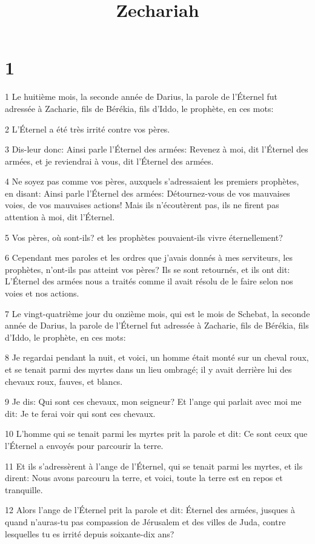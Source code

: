

\title{Zechariah}


\chapter{1}

\par 1 Le huitième mois, la seconde année de Darius, la parole de l'Éternel fut adressée à Zacharie, fils de Bérékia, fils d'Iddo, le prophète, en ces mots:
\par 2 L'Éternel a été très irrité contre vos pères.
\par 3 Dis-leur donc: Ainsi parle l'Éternel des armées: Revenez à moi, dit l'Éternel des armées, et je reviendrai à vous, dit l'Éternel des armées.
\par 4 Ne soyez pas comme vos pères, auxquels s'adressaient les premiers prophètes, en disant: Ainsi parle l'Éternel des armées: Détournez-vous de vos mauvaises voies, de vos mauvaises actions! Mais ils n'écoutèrent pas, ils ne firent pas attention à moi, dit l'Éternel.
\par 5 Vos pères, où sont-ils? et les prophètes pouvaient-ils vivre éternellement?
\par 6 Cependant mes paroles et les ordres que j'avais donnés à mes serviteurs, les prophètes, n'ont-ils pas atteint vos pères? Ils se sont retournés, et ils ont dit: L'Éternel des armées nous a traités comme il avait résolu de le faire selon nos voies et nos actions.
\par 7 Le vingt-quatrième jour du onzième mois, qui est le mois de Schebat, la seconde année de Darius, la parole de l'Éternel fut adressée à Zacharie, fils de Bérékia, fils d'Iddo, le prophète, en ces mots:
\par 8 Je regardai pendant la nuit, et voici, un homme était monté sur un cheval roux, et se tenait parmi des myrtes dans un lieu ombragé; il y avait derrière lui des chevaux roux, fauves, et blancs.
\par 9 Je dis: Qui sont ces chevaux, mon seigneur? Et l'ange qui parlait avec moi me dit: Je te ferai voir qui sont ces chevaux.
\par 10 L'homme qui se tenait parmi les myrtes prit la parole et dit: Ce sont ceux que l'Éternel a envoyés pour parcourir la terre.
\par 11 Et ils s'adressèrent à l'ange de l'Éternel, qui se tenait parmi les myrtes, et ils dirent: Nous avons parcouru la terre, et voici, toute la terre est en repos et tranquille.
\par 12 Alors l'ange de l'Éternel prit la parole et dit: Éternel des armées, jusques à quand n'auras-tu pas compassion de Jérusalem et des villes de Juda, contre lesquelles tu es irrité depuis soixante-dix ans?
